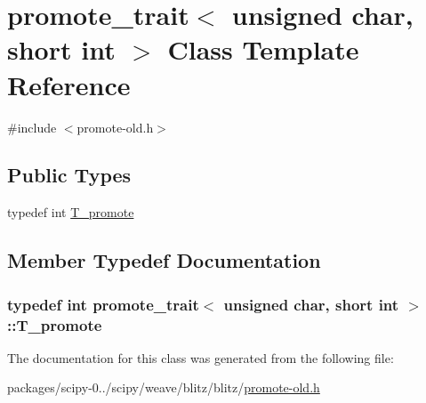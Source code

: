 \hypertarget{classpromote__trait_3_01unsigned_01char_00_01short_01int_01_4}{}\section{promote\+\_\+trait$<$ unsigned char, short int $>$ Class Template Reference}
\label{classpromote__trait_3_01unsigned_01char_00_01short_01int_01_4}


{\ttfamily \#include $<$promote-\/old.\+h$>$}

\subsection*{Public Types}
\begin{DoxyCompactItemize}
\item 
typedef int \hyperlink{classpromote__trait_3_01unsigned_01char_00_01short_01int_01_4_a511eb0c0e6db248d4a6a8388a7a3e115}{T\+\_\+promote}
\end{DoxyCompactItemize}


\subsection{Member Typedef Documentation}
\hypertarget{classpromote__trait_3_01unsigned_01char_00_01short_01int_01_4_a511eb0c0e6db248d4a6a8388a7a3e115}{}
\subsubsection[{T\+\_\+promote}]{\setlength{\rightskip}{0pt plus 5cm}typedef int {\bf promote\+\_\+trait}$<$ unsigned char, short int $>$\+::{\bf T\+\_\+promote}}\label{classpromote__trait_3_01unsigned_01char_00_01short_01int_01_4_a511eb0c0e6db248d4a6a8388a7a3e115}


The documentation for this class was generated from the following file\+:\begin{DoxyCompactItemize}
\item 
packages/scipy-\/0../scipy/weave/blitz/blitz/\hyperlink{promote-old_8h}{promote-\/old.\+h}\end{DoxyCompactItemize}
